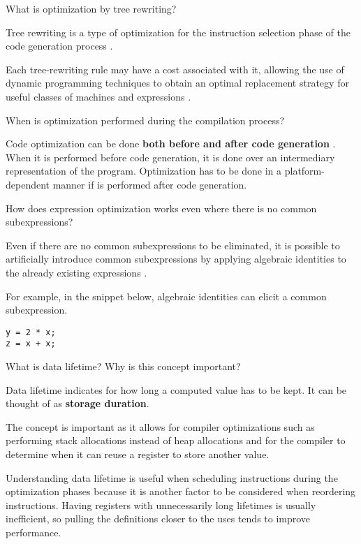 \begin{Exercise}
What is optimization by tree rewriting?
\end{Exercise}
\begin{Answer}
Tree rewriting is a type of optimization for the instruction selection phase of the code generation process \cite[p.~558]{compilers-aho-2007}.

Each tree-rewriting rule may have a cost associated with it, allowing the use of dynamic programming techniques to obtain an optimal replacement strategy for useful classes of machines and expressions \cite[p.~579]{compilers-aho-2007}.
\end{Answer}

\begin{Exercise}
When is optimization performed during the compilation process?
\end{Exercise}
\begin{Answer}
Code optimization can be done \textbf{both before and after code generation} \cite[p.~5]{compilers-aho-2007}.
When it is performed before code generation, it is done over an intermediary representation of the program.
Optimization has to be done in a platform-dependent manner if is performed after code generation.
\end{Answer}

\begin{Exercise}
How does expression optimization works even where there is no common subexpressions?
\end{Exercise}
\begin{Answer}
Even if there are no common subexpressions to be eliminated, it is possible to artificially introduce common subexpressions by applying algebraic identities to the already existing expressions \cite[p.~535]{compilers-aho-2007}.

For example, in the snippet below, algebraic identities can elicit a common subexpression.

\begin{lstlisting}
y = 2 * x;
z = x + x;
\end{lstlisting}
\end{Answer}

\begin{Exercise}[difficulty=1]
What is data lifetime? Why is this concept important?
\end{Exercise}
\begin{Answer}
Data lifetime indicates for how long a computed value has to be kept.
It can be thought of as \textbf{storage duration}.

The concept is important as it allows for compiler optimizations such as performing stack allocations instead of heap allocations and for the compiler to determine when it can reuse a register to store another value.

Understanding data lifetime is useful when scheduling instructions during the optimization phases because it is another factor to be considered when reordering instructions.
Having registers with unnecessarily long lifetimes is usually inefficient, so pulling the definitions closer to the uses tends to improve performance.
\end{Answer}

